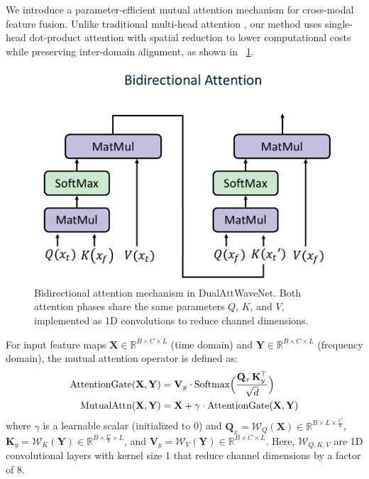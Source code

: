 \documentclass[conference]{IEEEtran}
\begin{document}
We introduce a parameter-efficient mutual attention mechanism for cross-modal feature fusion. Unlike traditional multi-head attention \cite{vaswaniAttentionAllYou2017}, our method uses single-head dot-product attention with spatial reduction to lower computational costs while preserving inter-domain alignment, as shown in \figurename~\ref{fig:bidirectional-attention}.

\begin{figure}[htbp]
    \centering
    \includegraphics[width=0.65\linewidth]{bidirectional-attention.pdf}
    \caption{Bidirectional attention mechanism in DualAttWaveNet. Both attention phases share the same parameters $Q$, $K$, and $V$, implemented as 1D convolutions to reduce channel dimensions.}
    \label{fig:bidirectional-attention}
\end{figure}

For input feature maps $\mathbf{X} \in \mathbb{R}^{B \times C \times L}$ (time domain) and $\mathbf{Y} \in \mathbb{R}^{B \times C \times L}$ (frequency domain), the mutual attention operator is defined as:
\begin{equation}
    \begin{aligned}
        \text{AttentionGate}(\mathbf{X}, \mathbf{Y}) & = \mathbf{V}_y \cdot \text{Softmax}\Bigl(\frac{\mathbf{Q}_x\, \mathbf{K}_y^\top}{\sqrt{d}}\Bigr) \\
        \text{MutualAttn}(\mathbf{X}, \mathbf{Y})    & = \mathbf{X} + \gamma \cdot \text{AttentionGate}(\mathbf{X}, \mathbf{Y})
    \end{aligned}
\end{equation}
where $\gamma$ is a learnable scalar (initialized to 0) and $\mathbf{Q}_x = \mathcal{W}_Q(\mathbf{X}) \in \mathbb{R}^{B \times L \times \frac{C}{8}}$, $\mathbf{K}_y = \mathcal{W}_K(\mathbf{Y}) \in \mathbb{R}^{B \times \frac{C}{8} \times L}$, and $\mathbf{V}_y = \mathcal{W}_V(\mathbf{Y}) \in \mathbb{R}^{B \times C \times L}$. Here, $\mathcal{W}_{Q,K,V}$ are 1D convolutional layers with kernel size 1 that reduce channel dimensions by a factor of 8.
\end{document}
